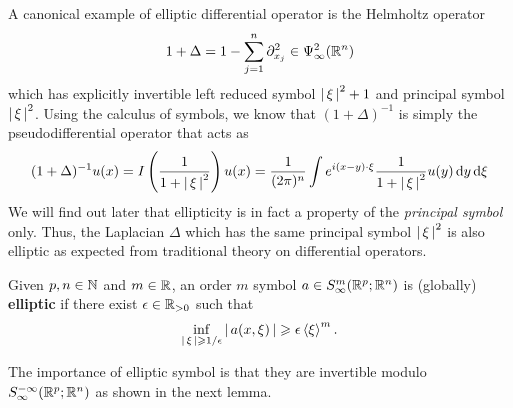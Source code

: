 \documentclass[12pt]{article}
\begin{document}
A canonical example of elliptic differential operator is the Helmholtz operator 
\begin{align*}
1  + \Delta = 1 - \sum_{j = 1}^ n \p_{x_j}^2 \in \Psi^{2}_{\infty}(\R^n)
\end{align*}
which has explicitly invertible left reduced symbol $\abs{\xi}^2 + 1$ and principal symbol $\abs{\xi}^2$. Using the calculus of symbols, we know that $(1 + \Delta)^{-1}$ is simply the pseudodifferential operator that acts as 
\begin{align*}
(1 + \Delta)^{-1} u(x) = I\brac{\frac{1}{1 + \abs{\xi}^2} } u(x) = \frac{1}{(2\pi)^n} \int e^{i(x - y) \cdot \xi} \frac{1}{1 + \abs{\xi}^2} u(y) \d[y] \d[\xi]
\end{align*}
We will find out later that ellipticity is in fact a property of the \textit{principal symbol} only. Thus, the Laplacian $\Delta$ which has the same principal symbol $\abs{\xi}^2$ is also elliptic as expected from traditional theory on differential operators. 



\begin{fdefinition}
    Given $p, n \in \N$ and $m \in \R$, an order $m$ symbol $a \in S^m_\infty(\R^p; \R^n)$ is (globally) \textbf{elliptic} if there exist $\epsilon \in \R_{>0}$ such that 
    \[
    \inf_{\abs{\xi} \geq 1/\epsilon} \abs{a(x, \xi)} \geq \epsilon \sym[\xi]^m. 
    \]
\end{fdefinition}

The importance of elliptic symbol is that they are invertible modulo $S^{-\infty}_\infty(\R^p; \R^n)$ as shown in the next lemma. 
\end{document}

